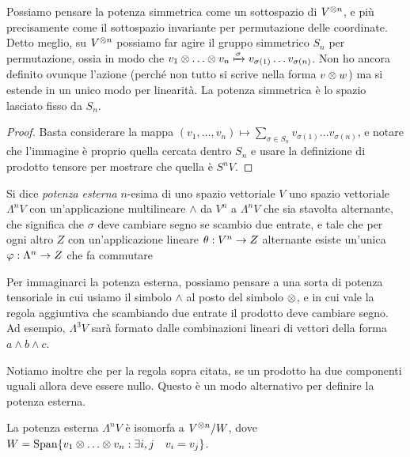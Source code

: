   \begin{myobs}
   Possiamo pensare la potenza simmetrica come un sottospazio di $V^{\otimes n}$, e più precisamente come il sottospazio invariante per permutazione delle coordinate. Detto meglio, su $V^{\otimes n}$ possiamo far agire il gruppo simmetrico $S_n$ per permutazione, ossia in modo che $v_1 \tensor \dots \tensor v_n \xmapsto{\sigma} v_{\sigma(1)} \dots v_{\sigma(n)}$. Non ho ancora definito ovunque l'azione (perché non tutto si scrive nella forma $v \otimes w$) ma si estende in un unico modo per linearità. La potenza simmetrica è lo spazio lasciato fisso da $S_n$.
  \end{myobs}

  \begin{proof}
   Basta considerare la mappa $(v_1,\dots,v_n) \mapsto \sum_{\sigma \in S_n} v_{\sigma(1)} \dots v_{\sigma(n)}$, e notare che l'immagine è proprio quella cercata dentro $S_n$ e usare la definizione di prodotto tensore per mostrare che quella è $S^nV$.
  \end{proof}
  
  \begin{mydef}
   Si dice \emph{potenza esterna} $n$-esima di uno spazio vettoriale $V$ uno spazio vettoriale $\Lambda^nV$ con un'applicazione multilineare $\wedge$ da $V^n$ a $\Lambda^nV$ che sia stavolta alternante, che significa che $\sigma$ deve cambiare segno se scambio due entrate, e tale che per ogni altro $Z$ con un'applicazione lineare $\theta: V^n \rightarrow Z$ alternante esiste un'unica $\varphi: \Lambda^n \rightarrow Z$ che fa commutare 
   
  
  \end{mydef}
    
  \begin{myobs}
   Per immaginarci la potenza esterna, possiamo pensare a una sorta di potenza tensoriale in cui usiamo il simbolo $\wedge$ al posto del simbolo $\otimes$, e in cui vale la regola aggiuntiva che scambiando due entrate il prodotto deve cambiare segno. Ad esempio, $\Lambda^3V$ sarà formato dalle combinazioni lineari di vettori della forma $a\wedge b \wedge c$. 
   
   Notiamo inoltre che per la regola sopra citata, se un prodotto ha due componenti uguali allora deve essere nullo. Questo è un modo alternativo per definire la potenza esterna.
  \end{myobs}
  
  \begin{myprop}
   La potenza esterna $\Lambda^nV$ è isomorfa a $V^{\otimes n}/W$, dove $W=\Span\{v_1 \tensor \dots \tensor v_n: \exists i,j\quad v_i=v_j\}$.
  \end{myprop}
